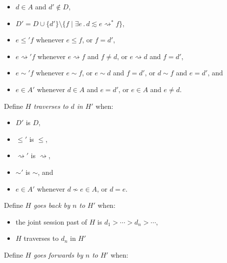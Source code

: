 \documentclass{article}
\newcommand{\aNH}{H}
\newcommand{\Docs}{D}
\newcommand{\Active}{A}
\newcommand{\parentOf}{\rightsquigarrow}
\newcommand{\leChron}{\le}
\newcommand{\gtChron}{>}
\newcommand{\eqSess}{\sim}
\newcommand{\ltSess}{\lesssim}
\newcommand{\aDoc}{d}
\newcommand{\bDoc}{e}
\newcommand{\cDoc}{f}
\newcommand{\st}{\mathbin.}
\begin{document}
\begin{itemize}
\item $\aDoc\in\Active$ and $\aDoc'\notin\Docs$,
\item $\Docs' = \Docs \cup \{\aDoc'\} \setminus
  \{ \cDoc \mid \exists \bDoc \st \aDoc \ltSess \bDoc \parentOf^* \cDoc \}$,
\item $\bDoc \leChron' \cDoc$ whenever
  $\bDoc \leChron \cDoc$, or $\cDoc = \aDoc'$,
\item $\bDoc \parentOf' \cDoc$ whenever
  $\bDoc \parentOf \cDoc$ and $\cDoc \neq \aDoc$, or
  $\bDoc \parentOf \aDoc$ and $\cDoc = \aDoc'$,
\item $\bDoc \eqSess' \cDoc$ whenever
  $\bDoc \eqSess \cDoc$, or
  $\bDoc \eqSess \aDoc$ and $\cDoc = \aDoc'$, or
  $\aDoc \eqSess \cDoc$ and $\bDoc = \aDoc'$, and
\item $\bDoc \in \Active'$ whenever
  $\aDoc \in \Active$ and $\bDoc=\aDoc'$, or
  $\bDoc \in \Active$ and $\bDoc\ne\aDoc$.
\end{itemize}
Define \emph{$\aNH$ traverses to $\aDoc$ in $\aNH'$} when:
\begin{itemize}
\item $\Docs'$ is $\Docs$,
\item $\leChron'$ is $\leChron$,
\item $\parentOf'$ is $\parentOf$,
\item $\eqSess'$ is $\eqSess$, and
\item $\bDoc\in\Active'$ whenever $\aDoc\not\eqSess\bDoc \in \Active$, or
  $\aDoc=\bDoc$.
\end{itemize}
Define \emph{$\aNH$ goes back by $n$ to $\aNH'$} when:
\begin{itemize}
\item the joint session past of $\aNH$ is $\aDoc_1 \gtChron \cdots \gtChron \aDoc_n \gtChron \cdots$,
\item $H$ traverses to $d_n$ in $H'$
\end{itemize}
Define \emph{$\aNH$ goes forwards by $n$ to $\aNH'$} when:
\end{document}
